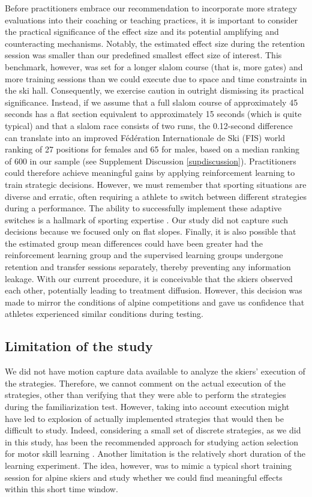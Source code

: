 \documentclass[pdflatex,sn-nature]{sn-jnl}%
\theoremstyle{thmstyleone}%
\theoremstyle{thmstyletwo}%
\theoremstyle{thmstylethree}%
\begin{document}
Before practitioners embrace our recommendation to incorporate more strategy evaluations into their coaching or teaching practices, it is important to consider the practical significance of the effect size and its potential amplifying and counteracting mechanisms\cite{anvari_not_2023}. Notably, the estimated effect size during the retention session was smaller than our predefined smallest effect size of interest. This benchmark, however, was set for a longer slalom course (that is, more gates) and more training sessions than we could execute due to space and time constraints in the ski hall. Consequently, we exercise caution in outright dismissing its practical significance. Instead, if we assume that a full slalom course of approximately 45 seconds has a flat section equivalent to approximately 15 seconds (which is quite typical) and that a slalom race consists of two runs, the 0.12-second difference can translate into an improved Fédération Internationale de Ski (FIS) world ranking of 27 positions for females and 65 for males, based on a median ranking of 600 in our sample (see Supplement Discussion \ref{supdiscussion}). Practitioners could therefore achieve meaningful gains by applying reinforcement learning to train strategic decisions. However, we must remember that sporting situations are diverse and erratic, often requiring a athlete to switch between different strategies during a performance. The ability to successfully implement these adaptive switches is a hallmark of sporting expertise  \cite{mangalam_investigating_2023, krakauer_motor_2019, stanley_motor_2013}. Our study did not capture such decisions because we focused only on flat slopes. Finally, it is also possible that the estimated group mean differences could have been greater had the reinforcement learning group and the supervised learning groups undergone retention and transfer sessions separately, thereby preventing any information leakage. With our current procedure, it is conceivable that the skiers observed each other, potentially leading to treatment diffusion. However, this decision was made to mirror the conditions of alpine competitions and gave us confidence that athletes experienced similar conditions during testing.

\subsection{Limitation of the study}
We did not have motion capture data available to analyze the skiers' execution of the strategies. Therefore, we cannot comment on the actual execution of the strategies, other than verifying that they were able to perform the strategies during the familiarization test. However, taking into account execution might have led to explosion of actually implemented strategies that would then be difficult to study. Indeed, considering a small set of discrete strategies, as we did in this study, has been the recommended approach for studying action selection for motor skill learning \cite{taylor_role_2012, taylor_flexible_2011}. Another limitation is the relatively short duration of the learning experiment. The idea, however, was to mimic a typical short training session for alpine skiers and study whether we could find meaningful effects within this short time window.
\end{document}
